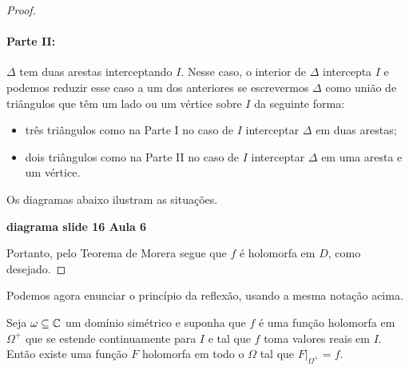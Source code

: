 \begin{proof}
        \paragraph{Parte II:} $\Delta$ tem duas arestas interceptando $I$. Nesse caso, o interior
        de $\Delta$ intercepta $I$ e podemos reduzir esse caso a um dos anteriores se escrevermos 
        $\Delta$ como união de triângulos que têm um lado ou um vértice sobre $I$ da seguinte forma:
        \begin{itemize}
            \item três triângulos como na Parte I no caso de $I$ interceptar $\Delta$
            em duas arestas;
            \item dois triângulos como na Parte II no caso de $I$ interceptar $\Delta$
            em uma aresta e um vértice.
        \end{itemize}
        Os diagramas abaixo ilustram as situações.
        \begin{center}
            {\bf diagrama slide 16 Aula 6}
        \end{center}
        Portanto, pelo Teorema de Morera segue que $f$ é holomorfa em $D$, como desejado.
    \end{proof}
    
    Podemos agora enunciar o princípio da reflexão, usando a mesma notação acima.
    
    \begin{teorema}
    \label{teo-reflexao-schwarz}
        Seja $\omega\subseteq\mathbb{C}$ um domínio simétrico e
        suponha que $f$ é uma função holomorfa em $\Omega^+$ que se estende 
        continuamente para $I$ e tal que $f$ toma valores reais em $I$. 
        Então existe uma função $F$ holomorfa em todo o $\Omega$ tal que
        $F\big|_{\Omega^+} = f$.
    \end{teorema}
        
